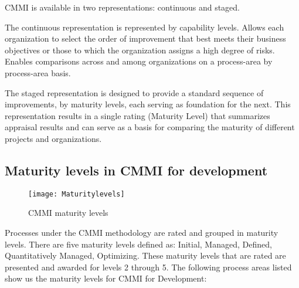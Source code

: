 CMMI is available in two representations: continuous and staged.

The continuous representation is represented by capability levels. Allows each organization to select the order of improvement that best meets their business objectives or those to which the organization assigns a high degree of risks. Enables comparisons across and among organizations on a process-area by process-area basis.


The staged representation is designed to provide a standard sequence of improvements, by maturity levels, each serving as foundation for the next. This representation results in a single rating (Maturity Level) that summarizes appraisal results and can serve as a basis for comparing the maturity of different projects and organizations.

\subsection{Maturity levels in CMMI for development}
\begin{figure}[h]
	\begin{center}
		\leavevmode
		\texttt{[image: Maturitylevels]}
		\caption{CMMI maturity levels}
		\label{fig:maturitylevels}
	\end{center}
\end{figure}
Processes under the CMMI methodology are rated and grouped in maturity levels. There are five  maturity levels defined as: Initial, Managed, Defined, Quantitatively Managed, Optimizing. These maturity levels that are rated are presented and awarded for levels 2 through 5. The following process areas listed show us the maturity levels for CMMI for Development:

